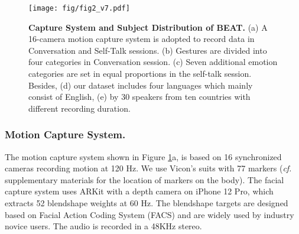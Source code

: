 \documentclass[runningheads]{llncs}
\begin{document}
\begin{figure}[h]
    \centering
    \texttt{[image: fig/fig2\_v7.pdf]}
    \vspace{-0.3cm}
    \caption{\textbf{Capture System and Subject Distribution of BEAT.} (a) A 16-camera motion capture system is adopted to record data in Conversation and Self-Talk sessions. (b) Gestures are divided into four categories in Conversation session. (c) Seven additional emotion categories are set in equal proportions in the self-talk session. Besides, (d) our dataset includes four languages which mainly consist of English, (e) by 30 speakers from ten countries with different recording duration.}
    \label{fig:fig2}
    \vspace{-1cm}
\end{figure} 
\subsubsection{Motion Capture System.} The motion capture system shown in Figure \ref{fig:fig2}a, is based on 16 synchronized cameras recording motion at 120 Hz. We use Vicon's suits with 77 markers (\textit{cf.} supplementary materials for the location of markers on the body). The facial capture system uses ARKit with a depth camera on iPhone 12 Pro, which extracts 52 blendshape weights at 60 Hz. The blendshape targets are designed based on Facial Action Coding System (FACS) and are widely used by industry novice users. The audio is recorded in a 48KHz stereo.


\vspace{-0.5cm}
\end{document}
